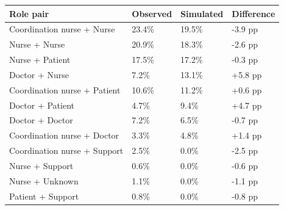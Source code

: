 \begin{tabular}{llll}
\toprule
\textbf{Role pair} & \textbf{Observed} & \textbf{Simulated} & \textbf{Difference} \\
\midrule
Coordination nurse + Nurse & 23.4\% & 19.5\% & -3.9 pp \\
Nurse + Nurse & 20.9\% & 18.3\% & -2.6 pp \\
Nurse + Patient & 17.5\% & 17.2\% & -0.3 pp \\
Doctor + Nurse & 7.2\% & 13.1\% & +5.8 pp \\
Coordination nurse + Patient & 10.6\% & 11.2\% & +0.6 pp \\
Doctor + Patient & 4.7\% & 9.4\% & +4.7 pp \\
Doctor + Doctor & 7.2\% & 6.5\% & -0.7 pp \\
Coordination nurse + Doctor & 3.3\% & 4.8\% & +1.4 pp \\
Coordination nurse + Support & 2.5\% & 0.0\% & -2.5 pp \\
Nurse + Support & 0.6\% & 0.0\% & -0.6 pp \\
Nurse + Unknown & 1.1\% & 0.0\% & -1.1 pp \\
Patient + Support & 0.8\% & 0.0\% & -0.8 pp \\
\bottomrule
\end{tabular}
